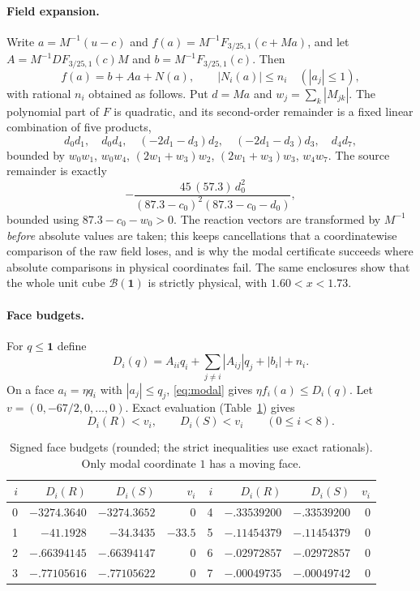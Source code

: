 \documentclass[11pt,a4paper]{article}
\theoremstyle{plain}
\theoremstyle{definition}
\theoremstyle{remark}
\begin{document}
\paragraph{Field expansion.}
Write $a=M^{-1}(u-c)$ and $f(a)=M^{-1}F_{3/25,1}(c+Ma)$, and let
$A=M^{-1}DF_{3/25,1}(c)M$ and $b=M^{-1}F_{3/25,1}(c)$. Then
\begin{equation}\label{eq:modal}
f(a)=b+Aa+N(a),\qquad |N_i(a)|\le n_i\quad(|a_j|\le1),
\end{equation}
with rational $n_i$ obtained as follows. Put $d=Ma$ and $w_j=\sum_k|M_{jk}|$.
The polynomial part of $F$ is quadratic, and its second-order remainder is a
fixed linear combination of five products,
\[
d_0d_1,\quad d_0d_4,\quad(-2d_1-d_3)d_2,\quad(-2d_1-d_3)d_3,\quad d_4d_7,
\]
bounded by $w_0w_1$, $w_0w_4$, $(2w_1+w_3)w_2$, $(2w_1+w_3)w_3$, $w_4w_7$.
The source remainder is exactly
\begin{equation}\label{eq:source-rem}
-\frac{45\,(57.3)\,d_0^2}{(87.3-c_0)^2(87.3-c_0-d_0)},
\end{equation}
bounded using $87.3-c_0-w_0>0$. The reaction vectors are transformed by
$M^{-1}$ \emph{before} absolute values are taken; this keeps cancellations
that a coordinatewise comparison of the raw field loses, and is why the modal
certificate succeeds where absolute comparisons in physical coordinates fail.
The same enclosures show that the whole unit cube $\mathcal B(\mathbf 1)$ is
strictly physical, with $1.60<x<1.73$.

\paragraph{Face budgets.}
For $q\le\mathbf1$ define
\begin{equation}\label{eq:budget}
D_i(q)=A_{ii}q_i+\sum_{j\ne i}|A_{ij}|q_j+|b_i|+n_i .
\end{equation}
On a face $a_i=\eta q_i$ with $|a_j|\le q_j$, \eqref{eq:modal} gives
$\eta f_i(a)\le D_i(q)$. Let $v=(0,-67/2,0,\dots,0)$. Exact evaluation
(Table~\ref{tab:faces}) gives
\begin{equation}\label{eq:face-checks}
D_i(R)<v_i,\qquad D_i(S)<v_i\qquad(0\le i<8).
\end{equation}

\begin{table}[t]\centering\small
\caption{Signed face budgets (rounded; the strict inequalities use exact
rationals). Only modal coordinate $1$ has a moving face.}
\label{tab:faces}
\begin{tabular}{rrrr@{\qquad}rrrr}\toprule
$i$&$D_i(R)$&$D_i(S)$&$v_i$&$i$&$D_i(R)$&$D_i(S)$&$v_i$\\\midrule
0&$-3274.3640$&$-3274.3652$&0&4&$-.33539200$&$-.33539200$&0\\
1&$-41.1928$&$-34.3435$&$-33.5$&5&$-.11454379$&$-.11454379$&0\\
2&$-.66394145$&$-.66394147$&0&6&$-.02972857$&$-.02972857$&0\\
3&$-.77105616$&$-.77105622$&0&7&$-.00049735$&$-.00049742$&0\\
\bottomrule\end{tabular}
\end{table}
\end{document}
